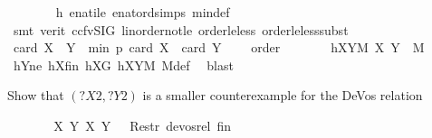 \begin{isabellebody}
\ \ \ \ \ \ \isamarkupfalse%
\ h\ enat{\isacharunderscore}{\kern0pt}ile\ enat{\isacharunderscore}{\kern0pt}ord{\isacharunderscore}{\kern0pt}simps{\isacharparenleft}{\kern0pt}{}{\isacharparenright}{\kern0pt}\ min{\isacharunderscore}{\kern0pt}def\isanewline
\ \ \ \ \ \ \isamarkupfalse%
\ {\isacharparenleft}{\kern0pt}smt\ {\isacharparenleft}{\kern0pt}verit{\isacharcomma}{\kern0pt}\ ccfv{\isacharunderscore}{\kern0pt}SIG{\isacharparenright}{\kern0pt}\ linorder{\isacharunderscore}{\kern0pt}not{\isacharunderscore}{\kern0pt}le\ order{\isacharunderscore}{\kern0pt}le{\isacharunderscore}{\kern0pt}less\ order{\isacharunderscore}{\kern0pt}le{\isacharunderscore}{\kern0pt}less{\isacharunderscore}{\kern0pt}subst{}{\isacharparenright}{\kern0pt}\isanewline
\ \ \ \ \isamarkupfalse%
\ \isamarkupfalse%
\ {\isachardoublequoteopen}card\ {\isacharparenleft}{\kern0pt}{\isacharquery}{\kern0pt}X{}\ {\isasymcdots}\ {\isacharquery}{\kern0pt}Y{}{\isacharparenright}{\kern0pt}\ {\isacharless}{\kern0pt}\ min\ p\ {\isacharparenleft}{\kern0pt}card\ {\isacharquery}{\kern0pt}X{}\ {\isacharplus}{\kern0pt}\ card\ {\isacharquery}{\kern0pt}Y{}\ {\isacharminus}{\kern0pt}\ {}{\isacharparenright}{\kern0pt}{\isachardoublequoteclose}\ \isamarkupfalse%
\ order\isanewline
\ \ \ \ \isamarkupfalse%
\ \isamarkupfalse%
\ hXY{}M{\isacharcolon}{\kern0pt}\ {\isachardoublequoteopen}{\isacharparenleft}{\kern0pt}{\isacharquery}{\kern0pt}X{}{\isacharcomma}{\kern0pt}\ {\isacharquery}{\kern0pt}Y{}{\isacharparenright}{\kern0pt}\ {\isasymin}\ M{\isachardoublequoteclose}\ \isamarkupfalse%
\ hY{}ne\ hX{}fin\ hX{}G\ hXYM\ M{\isacharunderscore}{\kern0pt}def\ \isamarkupfalse%
\ blast%
\begin{isamarkuptext}%
Show that $(?X2, ?Y2)$ is a smaller counterexample for the DeVos relation%
\end{isamarkuptext}\isamarkuptrue%
\ \ \ \ \isamarkupfalse%
\ \isamarkupfalse%
\ {\isachardoublequoteopen}{\isacharparenleft}{\kern0pt}{\isacharparenleft}{\kern0pt}{\isacharquery}{\kern0pt}X{}{\isacharcomma}{\kern0pt}\ {\isacharquery}{\kern0pt}Y{}{\isacharparenright}{\kern0pt}{\isacharcomma}{\kern0pt}\ {\isacharparenleft}{\kern0pt}X{\isacharcomma}{\kern0pt}\ Y{\isacharparenright}{\kern0pt}{\isacharparenright}{\kern0pt}\ {\isasymin}\ \ Restr\ devos{\isacharunderscore}{\kern0pt}rel\ {\isacharquery}{\kern0pt}fin{\isachardoublequoteclose}\ \isamarkupfalse%

\end{isabellebody}
